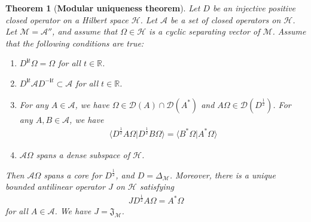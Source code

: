 \documentclass[12pt,b5paper,notitlepage]{article}
\theoremstyle{definition}
\theoremstyle{plain}
\newtheorem{thm}[df]{Theorem}
\newcommand{\fk}{\mathfrak}
\newcommand{\mc}{\mathcal}
\newcommand{\Dom}{\scr{D}}
\newcommand{\bk}[1]{\langle {#1}\rangle}
\newcommand{\scr}{\mathscr}
\newcommand{\im}{\mathbf{i}}
\newcommand{\Rbb}{\mathbb R}
\numberwithin{equation}{section}
\begin{document}
\begin{thm}[\textbf{Modular uniqueness theorem}]\label{lbb26}
Let $D$ be an injective positive closed operator on a Hilbert space $\mc H$. Let $\scr A$ be a set of closed operators on $\mc H$. Let $\mc M=\scr A''$, and assume that $\Omega\in\mc H$ is a cyclic separating vector of $\mc M$. Assume that the following conditions are true:
\begin{enumerate}[label=(\alph*)]
\item $D^{\im t}\Omega=\Omega$ for all $t\in\Rbb$.
\item $D^{\im t}\scr AD^{-\im t}\subset\scr A$ for all $t\in\Rbb$. 
\item For any $A\in\scr A$, we have $\Omega\in\Dom(A)\cap\Dom(A^*)$ and $A\Omega\in\Dom(D^{\frac 12})$. For any $A,B\in\scr A$, we have
\begin{align}\label{eqb40}
\bk{D^{\frac 12}A\Omega|D^{\frac 12}B\Omega}=\bk{B^*\Omega|A^*\Omega}
\end{align}
\item $\scr A\Omega$ spans a dense subspace of $\mc H$.
\end{enumerate}
Then $\scr A\Omega$ spans a core for $D^{\frac 12}$, and $D=\Delta_{\mc M}$. Moreover, there is a unique bounded antilinear operator $J$ on $\mc H$ satisfying
\begin{align}\label{eqb37}
JD^{\frac 12}A\Omega=A^*\Omega
\end{align}
for all $A\in\scr A$. We have $J=\fk J_{\mc M}$.
\end{thm}
\end{document}
